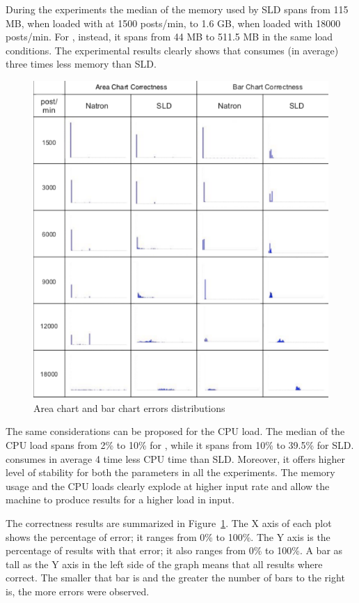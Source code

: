 During the experiments the median of the  memory used by SLD spans from 115 MB, when loaded with at 1500 posts/min, to 1.6 GB, when loaded with 18000 posts/min. For \sti{}, instead, it spans from 44 MB to 511.5 MB in the same load conditions. The experimental results clearly shows that \sti{} consumes (in average) three times less memory than SLD.

\begin{figure}[p]
\centering
\includegraphics[width=\textwidth]{img/comp-mod-errors}
\caption{Area chart and bar chart errors distributions}
\label{fig:errors}
\end{figure}

The same considerations can be proposed for the CPU load. The median of the CPU load spans  from 2\% to 10\% for \sti{}, while it spans from 10\% to 39.5\% for SLD. \sti{} consumes in average 4 time less CPU time than SLD. 
Moreover, it offers higher level of stability for both the parameters in all the experiments. The memory usage and the CPU loads clearly explode at higher input rate and allow the machine to produce results for a higher load in input.

The correctness results are summarized in Figure~\ref{fig:errors}. The X axis of each plot shows the percentage of error; it ranges from 0\% to 100\%. The Y axis is the percentage of results with that error; it also ranges from 0\% to 100\%. A bar as tall as the Y axis in the left side of the graph means that all results where correct. The smaller that bar is and the greater the number of bars to the right is, the more errors were observed.

